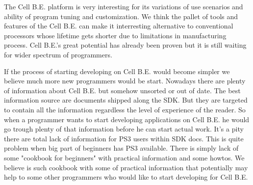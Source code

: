 \par
The Cell B.E. platform is very interesting for its variations of use scenarios and ability of program tuning and customization.
We think the pallet of tools and features of the Cell B.E. can make it interresting alternative to conventional processors whose lifetime gets shorter due to limitations in manufacturing process.
Cell B.E.'s great potential has already been proven but it is still waiting for wider spectrum of programmers.

\par
If the process of starting developing on Cell B.E. would become simpler we believe much more new programmers would be start.
Nowadays there are plenty of information about Cell B.E. but somehow unsorted or out of date.
The best information source are documents shipped along the SDK.
But they are targeted to contain all the information regardless the level of experience of the reader.
So when a programmer wants to start developing applications on Cell B.E. he would go trough plenty of that information before he can start actual work.
It's a pity there are total lack of information for PS3 users within SDK docs.
This is quite problem when big part of beginners has PS3 available.
There is simply lack of some "cookbook for beginners" with practical information and some howtos.
We believe is such cookbook with some of practical information that potentially may help to some other programmers who would like to start developing for Cell B.E.